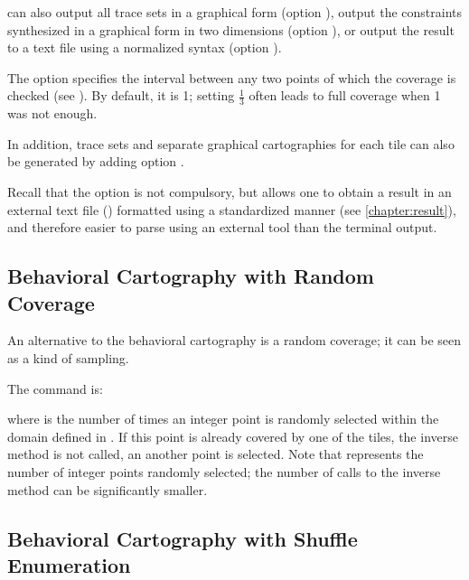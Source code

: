 \imitator{} can also
	output all trace sets in a graphical form (option ),
	output the constraints synthesized in a graphical form in two dimensions (option ),
	or
	output the result to a text file using a normalized syntax (option ).

The option  specifies the interval between any two points of which the coverage is checked (see \cite{AF10}).
By default, it is 1; setting $\frac{1}{3}$ often leads to full coverage when 1 was not enough.

In addition, trace sets and separate graphical cartographies for each tile can also be generated by adding option .

Recall that the option  is not compulsory, but allows one to obtain a result in an external text file () formatted using a standardized manner (see \cref{chapter:result}), and therefore easier to parse using an external tool than the terminal output.



\subsection*{Behavioral Cartography with Random Coverage}\label{sss:mode:BC:random}

An alternative to the behavioral cartography is a random coverage; it can be seen as a kind of sampling.

The command is:


\noindent{}where  is the number of times an integer point is randomly selected within the domain defined in .
If this point is already covered by one of the tiles, the inverse method is not called, an another point is selected.
Note that  represents the number of integer points randomly selected; the number of calls to the inverse method can be significantly smaller.


\subsection*{Behavioral Cartography with Shuffle Enumeration}\label{sss:mode:BC:shuffle}

